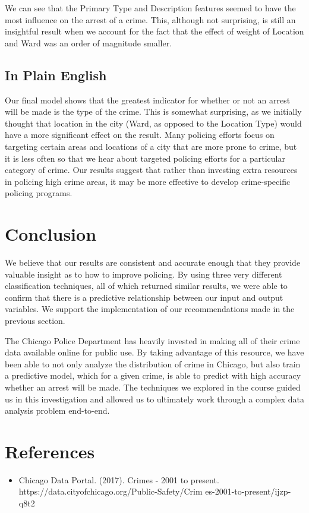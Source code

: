 \documentclass[10pt]{SelfArx} %
\begin{document}
    We can see that the Primary Type and Description features seemed to have the most influence on the arrest of a crime. This, although not surprising, is still an insightful result when we account for the fact that the effect of weight of Location and Ward was an order of magnitude smaller.

    \subsection{In Plain English}
    Our final model shows that the greatest indicator for whether or not an arrest will be made is the type of the crime. This is somewhat surprising, as we initially thought that location in the city (Ward, as opposed to the Location Type) would have a more significant effect on the result. Many policing efforts focus on targeting certain areas and locations of a city that are more prone to crime, but it is less often so that we hear about targeted policing efforts for a particular category of crime. Our results suggest that rather than investing extra resources in policing high crime areas, it may be more effective to develop crime-specific policing programs.

\section{Conclusion}

We believe that our results are consistent and accurate enough that they provide valuable insight as to how to improve policing. By using three very different classification techniques, all of which returned similar results, we were able to confirm that there is a predictive relationship between our input and output variables. We support the implementation of our recommendations made in the previous section.

The Chicago Police Department has heavily invested in making all of their crime data available online for public use. By taking advantage of this resource, we have been able to not only analyze the distribution of crime in Chicago, but also train a predictive model, which for a given crime, is able to predict with high accuracy whether an arrest will be made. The techniques we explored in the course guided us in this investigation and allowed us to ultimately work through a complex data analysis problem end-to-end. 

\section{References}
    \begin{itemize}
        \item Chicago Data Portal. (2017). Crimes - 2001 to present.
        https://data.cityofchicago.org/Public-Safety/Crim es-2001-to-present/ijzp-q8t2
    \end{itemize}
\end{document}
